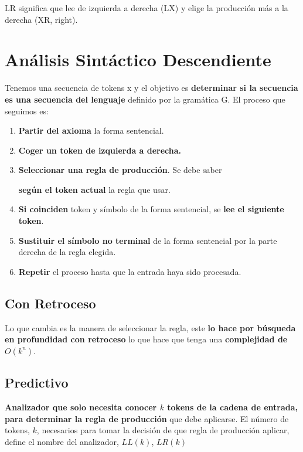 \documentclass[12pt, twoside, openright]{report} %
\begin{document}
LR significa que lee de izquierda a derecha (LX) y elige la producción
más a la derecha (XR, right).

\section{Análisis Sintáctico Descendiente}

Tenemos una secuencia de tokens x y el objetivo es \textbf{determinar si
	la secuencia es una secuencia del lenguaje} definido por la gramática G.
El proceso que seguimos es:

\begin{enumerate}
	\def\labelenumi{\arabic{enumi}.}
	\item \textbf{Partir del axioma} la forma sentencial.
	\item \textbf{Coger un token de izquierda a derecha.}
	\item \textbf{Seleccionar una regla de producción}. Se debe saber

	      \textbf{según el token actual} la regla que usar.
	\item \textbf{Si coinciden} token y símbolo de la forma sentencial, se
	      \textbf{lee el siguiente token}.
	\item \textbf{Sustituir el símbolo no terminal} de la forma sentencial por
	      la parte derecha de la regla elegida.
	\item \textbf{Repetir} el proceso hasta que la entrada haya sido procesada.
\end{enumerate}


\subsection{Con Retroceso}

Lo que cambia es la manera de seleccionar la regla, este \textbf{lo hace
	por búsqueda en profundidad con retroceso} lo que hace que tenga una
\textbf{complejidad de \(O(k^n)\)}.


\subsection{Predictivo}

\textbf{Analizador que solo necesita conocer \(k\) tokens de la cadena
	de entrada, para determinar la regla de producción} que debe aplicarse.
El número de tokens, \(k\), necesarios para tomar la decisión de que
regla de producción aplicar, define el nombre del analizador, \(LL(k)\),
\(LR(k)\)
\end{document}

